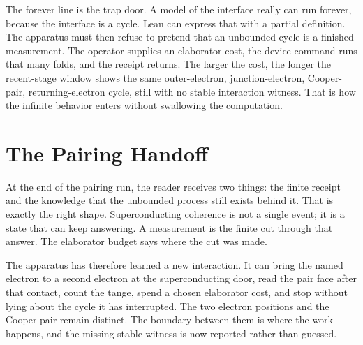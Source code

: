 The forever line is the trap door. A model of the interface really can run forever, because the interface is a
cycle. Lean can express that with a partial definition. The apparatus must then refuse to pretend that an
unbounded cycle is a finished measurement. The operator supplies an elaborator cost, the device command runs that
many folds, and the receipt returns. The larger the cost, the longer the recent-stage window shows the same
outer-electron, junction-electron, Cooper-pair, returning-electron cycle, still with no stable interaction
witness. That is how the infinite behavior enters without swallowing the computation.

\section{The Pairing Handoff}

At the end of the pairing run, the reader receives two things: the finite receipt and the knowledge that the
unbounded process still exists behind it. That is exactly the right shape. Superconducting coherence is not a
single event; it is a state that can keep answering. A measurement is the finite cut through that answer. The
elaborator budget says where the cut was made.

The apparatus has therefore learned a new interaction. It can bring the named electron to a second electron at
the superconducting door, read the pair face after that contact, count the tange, spend a chosen elaborator cost,
and stop without lying about the cycle it has interrupted. The two electron positions and the Cooper pair remain
distinct. The boundary between them is where the work happens, and the missing stable witness is now reported
rather than guessed.
